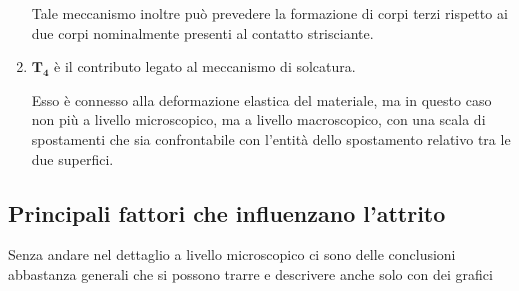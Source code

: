 \begin{enumerate}
Tale meccanismo inoltre può prevedere la formazione di corpi terzi rispetto ai due corpi nominalmente presenti al contatto strisciante.
\item $\mathbf{T_4}$ è il contributo legato al meccanismo di solcatura.

Esso è connesso alla deformazione elastica del materiale, ma in questo caso non più a livello microscopico, ma a livello macroscopico, con una scala di spostamenti che sia confrontabile con l'entità dello spostamento relativo tra le due superfici.
\end{enumerate}

\subsection{Principali fattori che influenzano l'attrito}
Senza andare nel dettaglio a livello microscopico ci sono delle conclusioni abbastanza generali che si possono trarre e descrivere anche solo con dei grafici
